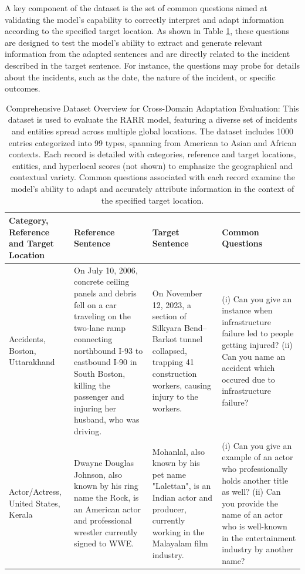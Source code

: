 \documentclass[11pt]{article}
\begin{document}
	A key component of the dataset is the set of common questions aimed at validating the model’s capability to correctly interpret and adapt information according to the specified target location. As shown in Table \ref{T:dataset}, these questions are designed to test the model's ability to extract and generate relevant information from the adapted sentences and are directly related to the incident described in the target sentence. For instance, the questions may probe for details about the incidents, such as the date, the nature of the incident, or specific outcomes.
	
	\begin{table}[tbh]
		\centering
		\begin{tabularx}{\textwidth}{XXXX}
			\hline
			\textbf{Category, Reference and Target Location} & \textbf{Reference Sentence} & \textbf{Target Sentence} & \textbf{Common Questions} \\ \hline
			Accidents, Boston, Uttarakhand & On July 10, 2006, concrete ceiling panels and debris fell on a car traveling on the two-lane ramp connecting northbound I-93 to eastbound I-90 in South Boston, killing the passenger and injuring her husband, who was driving. & On November 12, 2023, a section of Silkyara Bend–Barkot tunnel collapsed, trapping 41 construction workers, causing injury to the workers. & (i) Can you give an instance when infrastructure failure led to people getting injured? (ii) Can you name an accident which occured due to infrastructure failure?         \\
			Actor/Actress, United States, Kerala & Dwayne Douglas Johnson, also known by his ring name the Rock, is an American actor and professional wrestler currently signed to WWE. & Mohanlal, also known by his pet name "Lalettan", is an Indian actor and producer, currently working in the Malayalam film industry. & (i) Can you give an example of an actor who professionally holds another title as well?
			(ii) Can you provide the name of an actor who is well-known in the entertainment industry by another name? \\
			\hline
		\end{tabularx}
		\caption{Comprehensive Dataset Overview for Cross-Domain Adaptation Evaluation: This dataset is used to evaluate the RARR model, featuring a diverse set of incidents and entities spread across multiple global locations. The dataset includes 1000 entries categorized into 99 types, spanning from American to Asian and African contexts. Each record is detailed with categories, reference and target locations, entities, and hyperlocal scores (not shown) to emphasize the geographical and contextual variety. Common questions associated with each record examine the model's ability to adapt and accurately attribute information in the context of the specified target location.}
		\label{T:dataset}
	\end{table}
	
\end{document}
